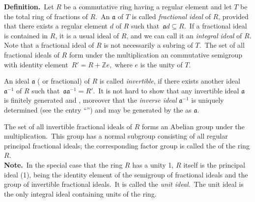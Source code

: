 \documentclass[12pt]{article}
\theoremstyle{definition}
\begin{document}
\textbf{Definition.}\, Let $R$ be a commutative ring having a regular element and let $T$ be the total ring of fractions of $R$.\, An  $\mathfrak{a}$ of $T$ is called {\em fractional ideal} of $R$, provided that there exists a regular element $d$ of $R$ such that\, $\mathfrak{a}d \subseteq R$.\, If a fractional ideal is contained in $R$, it is a usual ideal of $R$, and we can call it an {\em integral ideal} of $R$. \\

Note that a fractional ideal of $R$ is not necessarily a subring of $T$.\, The set of all fractional ideals of $R$ form under the multiplication an commutative semigroup with identity element\, $R' = R\!+\!\mathbb{Z}e$,\, where $e$ is the unity of $T$.

An ideal $\mathfrak{a}$ ( or fractional) of $R$ is called {\em invertible}, if there exists another ideal $\mathfrak{a}^{-1}$ of $R$ such that\, $\mathfrak{aa}^{-1} = R'$.\, It is not hard to show that any invertible ideal $\mathfrak{a}$ is finitely generated and , moreover that the {\em inverse ideal} $\mathfrak{a}^{-1}$ is uniquely determined (see the entry ``'') and may be generated by the  as $\mathfrak{a}$.

The set of all invertible fractional ideals of $R$ forms an Abelian group under the multiplication.\, This group has a normal subgroup consisting of all regular principal fractional ideals; the corresponding factor group is called the  of the ring $R$. \\

\textbf{Note.}\, In the special case that the ring $R$ has a unity 1, $R$ itself is the principal ideal (1), being the identity element of the semigroup of fractional ideals and the group of invertible fractional ideals.\, It is called the {\em unit ideal}.\, The unit ideal is the only integral ideal containing units of the ring.
\end{document}
